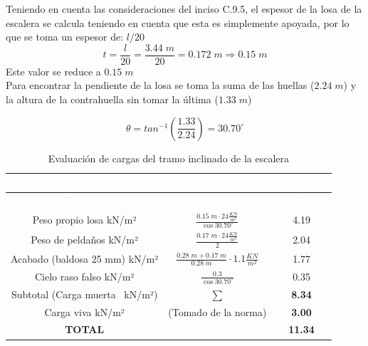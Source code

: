 \documentclass[12pt]{article}
\begin{document}
Teniendo en cuenta las consideraciones del inciso C.9.5, el espesor de la losa de la escalera se calcula teniendo en cuenta que esta es simplemente apoyada, por lo que se toma un espesor de: $l/20$
\begin{equation}
    t=\frac{l}{20}=\frac{3.44\;m}{20}=0.172\;m \Rightarrow 0.15\;m
\end{equation}
Este valor se reduce a $0.15\;m$ \\ %
Para encontrar la pendiente de la losa se toma la suma de las huellas ($2.24\;m$) y la altura de la contrahuella sin tomar la última ($1.33\;m$)

\begin{equation}
    \theta=tan^{-1}\left(\frac{1.33}{2.24}\right)=30.70^{\circ}
\end{equation}


\begin{table}[H]
\centering

\begin{tabular}{|c|c|c|} 
\hline
\multicolumn{3}{|c|}{{\cellcolor[rgb]{0.227,0.227,0.227}}\textcolor{white}{\textbf{EVALUACIÓN CARGAS TRAMO INCLINADO}}}                                 \\ 
\hline
\rowcolor[rgb]{0.227,0.227,0.227} \textcolor{white}{\textbf{Elemento}} & \textcolor{white}{\textbf{Operación}} & \textcolor{white}{\textbf{Resultado}}  \\ 
\hline
{\cellcolor[rgb]{1 ,1 ,1}}Peso propio losa
  kN/m²           &   $\frac{0.15\;m \cdot 24 \tfrac{KN}{m^3}}{\cos{30.70^{\circ}}}$                                  & 4.19                                 \\ 
\hline
{\cellcolor[rgb]{1,1,1}}Peso de peldaños
  kN/m²           & $\frac{0.17\;m \cdot 24 \tfrac{KN}{m^3}}{2}$                                     & 2.04                                 \\ 
\hline  
{\cellcolor[rgb]{1,1,1}}Acabado (baldosa 25
  mm) kN/m²    &  $\frac{0.28\;m + 0.17\;m}{0.28\;m}\cdot 1.1\tfrac{KN}{m^2}$                                    & 1.77                                   \\ 
\hline
{\cellcolor[rgb]{1,1,1}}Cielo raso falso kN/m²                   & $\frac{0.3}{\cos{30.70^{\circ}}}$                                      & 0.35                                   \\ 
\hline
{\cellcolor[rgb]{1,1,1}}Subtotal (Carga
  muerta~ kN/m²)   & $\mathbf{\sum}$                                    & \textbf{8.34  }                                 \\ 
\hline
{\cellcolor[rgb]{1,1,1}}Carga viva kN/m²                   & (Tomado de la norma)                                     & \textbf{3.00}                                   \\ 
\hline
{\cellcolor[rgb]{1,1,1}}\textbf{TOTAL}                     & ~                                     & \textbf{11.34}                         \\
\hline
\end{tabular}
\caption{Evaluación de cargas del tramo inclinado de la escalera}
\label{tab:evalINCLIN}
\end{table}
\end{document}
